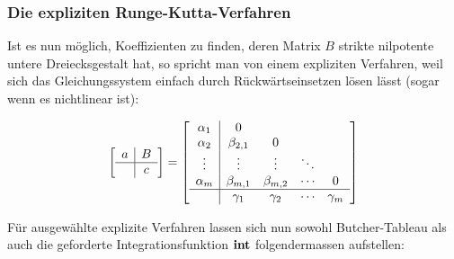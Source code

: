\documentclass[11pt]{article} %
\theoremstyle{definition}
\begin{document}
\subsubsection{Die expliziten Runge-Kutta-Verfahren}

Ist es nun möglich, Koeffizienten zu finden, deren Matrix $B$ strikte nilpotente untere Dreiecksgestalt hat, so spricht man von einem expliziten Verfahren, weil sich das Gleichungssystem einfach durch Rückwärtseinsetzen lösen lässt (sogar wenn es nichtlinear ist):

\[
\begin{bmatrix}
\begin{array}{c|c}
a & B\\
\hline     & c \\
\end{array}
\end{bmatrix} = \begin{bmatrix}
\begin{array}{c|cccc}
  \alpha_1 & 0  \\
  \alpha_2    & \beta_{2,1} & 0\\
  \vdots & \vdots & \vdots& \ddots\\
  \alpha_m    & \beta_{m,1} & \beta_{m,2}& \cdots & 0\\
  \hline & \gamma_1    & \gamma_2   & \cdots & \gamma_m\\
\end{array}

\end{bmatrix}
\]

Für ausgewählte explizite Verfahren lassen sich nun sowohl Butcher-Tableau als auch die geforderte Integrationsfunktion $\mathbf{int}$ folgendermassen aufstellen:
\end{document}
